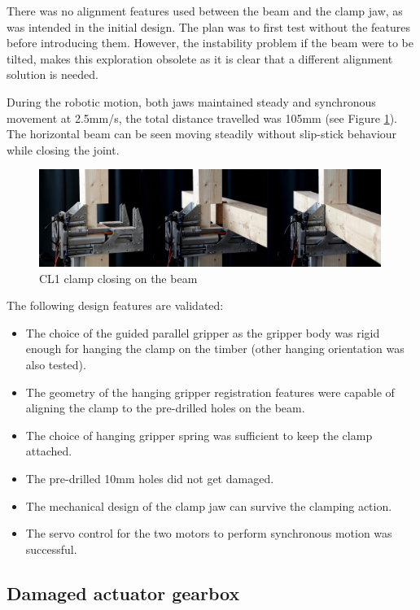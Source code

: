 There was no alignment features used between the beam and the clamp jaw, as was intended in the initial design. The plan was to first test without the features before introducing them. However, the instability problem if the beam were to be tilted, makes this exploration obsolete as it is clear that a different alignment solution is needed.

During the robotic motion, both jaws maintained steady and synchronous movement at 2.5mm/s, the total distance travelled was 105mm (see Figure \ref{fig:cl1-clamp-closing-photo}). The horizontal beam can be seen moving steadily without slip-stick behaviour while closing the joint.

\begin{figure}
    \centering
    \includegraphics[width=0.99\textwidth]{images/04-4+5/cl1-test-threesteps.jpg}
    \caption{CL1 clamp closing on the beam}
    \label{fig:cl1-clamp-closing-photo}
\end{figure}

The following design features are validated:
\begin{itemize}
    \item The choice of the guided parallel gripper as the gripper body was rigid enough for hanging the clamp on the timber (other hanging orientation was also tested).
    \item The geometry of the hanging gripper registration features were capable of aligning the clamp to the pre-drilled holes on the beam.
    \item The choice of hanging gripper spring was sufficient to keep the clamp attached.
    \item The pre-drilled 10mm holes did not get damaged.
    \item The mechanical design of the clamp jaw can survive the clamping action.
    \item The servo control for the two motors to perform synchronous motion was successful.
\end{itemize}

\subsection{Damaged actuator gearbox}
\label{subsection:exploration-1-damaged-actuator-gearbox}

